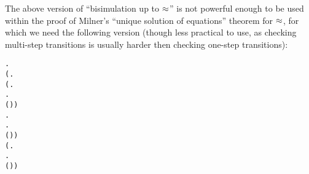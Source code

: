 The above version of ``bisimulation up to $\approx$'' 
is not powerful enough to be used within
the proof of 
Milner's ``unique solution of equations'' theorem for $\approx$, for
which we need 
the
following version (though less practical to use,
as checking multi-step transitions is  usually harder then
checking one-step transitions):
\begin{alltt}
  \HOLSymConst{\HOLTokenDefEquality{}}
  \HOLSymConst{\HOLTokenForall{}} .
         \HOLSymConst{\HOLTokenImp{}}
      (\HOLSymConst{\HOLTokenForall{}}.
           (\HOLSymConst{\HOLTokenForall{}}.
                 \HOLTokenWeakTransBegin{} \HOLTokenImp{}  \HOLSymConst{\HOLTokenImp{}}
                \HOLSymConst{\HOLTokenExists{}}.
                     \HOLTokenWeakTransBegin{} \HOLTokenImp{}  \HOLSymConst{\HOLTokenConj{}}
                    ( \HOLSymConst{\HOLTokenRCompose{}}  \HOLSymConst{\HOLTokenRCompose{}} )  ) \HOLSymConst{\HOLTokenConj{}}
           \HOLSymConst{\HOLTokenForall{}}.
                \HOLTokenWeakTransBegin{} \HOLTokenImp{}  \HOLSymConst{\HOLTokenImp{}}
               \HOLSymConst{\HOLTokenExists{}}.
                    \HOLTokenWeakTransBegin{} \HOLTokenImp{}  \HOLSymConst{\HOLTokenConj{}}
                   ( \HOLSymConst{\HOLTokenRCompose{}}  \HOLSymConst{\HOLTokenRCompose{}} )  ) \HOLSymConst{\HOLTokenConj{}}
      (\HOLSymConst{\HOLTokenForall{}}.
            \HOLTokenWeakTransBegin\HOLSymConst{\ensuremath{\tau}}\HOLTokenImp{}  \HOLSymConst{\HOLTokenImp{}}
           \HOLSymConst{\HOLTokenExists{}}.
                \HOLSymConst{\HOLTokenEPS}  \HOLSymConst{\HOLTokenConj{}} ( \HOLSymConst{\HOLTokenRCompose{}}  \HOLSymConst{\HOLTokenRCompose{}} )  ) \HOLSymConst{\HOLTokenConj{}}

\end{alltt}
